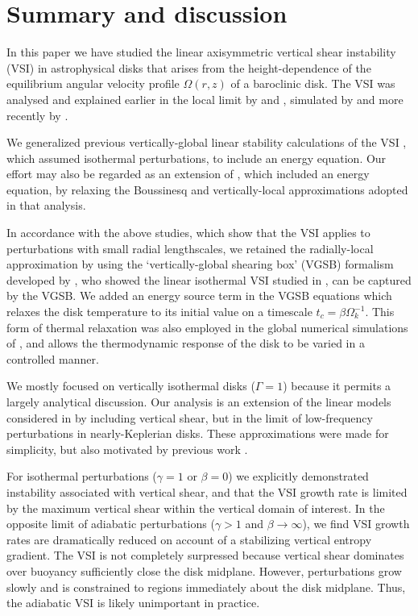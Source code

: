 \section{Summary and discussion}
In this paper we have studied the linear axisymmetric vertical shear
instability (VSI) in astrophysical disks that arises from the
height-dependence of the equilibrium angular velocity profile
$\Omega(r,z)$ of a baroclinic  disk. The VSI was analysed and
explained earlier in the local limit by \cite{urpin98} and
\cite{urpin03}, simulated by \cite{arlt04} and more  recently by
\cite{nelson13}.     

We generalized previous vertically-global linear stability calculations
of the VSI \citep{nelson13,mcnally14}, which assumed
isothermal perturbations, to include an energy equation. Our effort
may also be regarded as an extension of \cite{urpin03}, which 
included an energy equation, by relaxing the Boussinesq and  
vertically-local approximations adopted in that analysis.  

In accordance with the above studies, which show that the VSI   
applies to perturbations with small radial lengthscales, we retained
the radially-local approximation by using the `vertically-global
shearing box' (VGSB) formalism developed by \cite{mcnally14}, who 
showed the linear isothermal VSI studied in \cite{nelson13}, can
be captured by the VGSB. We added 
an energy source term in the VGSB equations which relaxes the disk
temperature to its initial value on a timescale
$t_c=\beta\Omega_k^{-1}$. This form of thermal relaxation was also 
employed in the global numerical simulations of \cite{nelson13}, and allows
the thermodynamic response of the disk to be varied in a controlled 
manner. 

We mostly focused on vertically isothermal disks ($\Gamma=1$) because
it permits a largely analytical discussion. Our analysis is an
extension of the linear models considered in \cite{lubow93} by
including vertical shear, but in the limit of low-frequency
perturbations in  nearly-Keplerian disks. These approximations were
made for simplicity, but also motivated by previous work
\citep{nelson13}.   

For isothermal perturbations ($\gamma=1$ or $\beta=0$) we explicitly
demonstrated instability 
associated with vertical shear, and that the VSI growth rate is
limited by the maximum vertical shear within the vertical domain of
interest. In the opposite limit of adiabatic perturbations ($\gamma>1$
and $\beta\to\infty$), we find VSI growth rates are dramatically
reduced on account of a stabilizing 
vertical entropy gradient. The VSI is not completely
surpressed because vertical shear dominates over buoyancy 
sufficiently close the disk midplane. However, perturbations grow
slowly and is constrained to regions immediately about the disk
midplane. Thus, the adiabatic VSI is likely unimportant in practice.  

